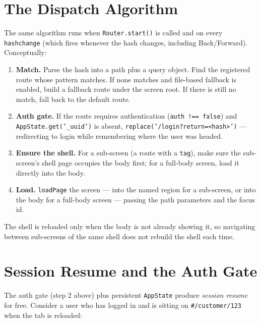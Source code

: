\section{The Dispatch Algorithm}
\label{sec:rs-dispatch}

The same algorithm runs when \texttt{Router.start()} is called and on every \texttt{hashchange} (which fires whenever the hash changes, including Back/Forward).  Conceptually:

\begin{enumerate}
  \item \textbf{Match.}  Parse the hash into a path plus a query object.  Find the registered route whose pattern matches.  If none matches and file-based fallback is enabled, build a fallback route under the screen root.  If there is still no match, fall back to the default route.
  \item \textbf{Auth gate.}  If the route requires authentication (\texttt{auth !== false}) and \texttt{AppState.get('\_uuid')} is absent, \texttt{replace('/login?return=<hash>')} --- redirecting to login while remembering where the user was headed.
  \item \textbf{Ensure the shell.}  For a sub-screen (a route with a \texttt{tag}), make sure the sub-screen's shell page occupies the body first; for a full-body screen, load it directly into the body.
  \item \textbf{Load.}  \texttt{loadPage} the screen --- into the named region for a sub-screen, or into the body for a full-body screen --- passing the path parameters and the focus id.
\end{enumerate}

\noindent
The shell is reloaded only when the body is not already showing it, so navigating between sub-screens of the same shell does not rebuild the shell each time.

\section{Session Resume and the Auth Gate}
\label{sec:rs-resume}

The auth gate (step 2 above) plus persistent \texttt{AppState} produce \emph{session resume} for free.  Consider a user who has logged in and is sitting on \texttt{\#/customer/123} when the tab is reloaded:

